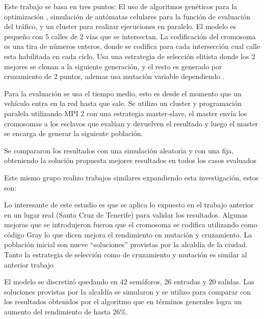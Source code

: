 \begin{itemize}
	\begin{item}
		
		Este trabajo se basa en tres puntos: El uso de algoritmos genéticos para la optimización , simulación de autómatas celulares para la función de evaluación del tráfico, y un cluster para realizar ejecuciones en paralelo.
		El modelo es pequeño con 5 calles de 2 vías que se intersectan.
		La codificación del cromosoma es una tira de números enteros, donde se codifica para cada intersección cual calle esta habilitada en cada ciclo.
		Usa una estrategia de selección elitista donde los 2 mejores se clonan a la siguiente generación, y el resto es generado por cruzamiento de 2 puntos, ademas usa mutación variable dependiendo .
		
		Para la evaluación se usa el tiempo medio, esto es desde el momento que un vehículo entra en la red hasta que sale. Se utilizo un cluster y programación paralela utilizando MPI 2 con una estrategia master-slave, el master envía los cromosomas a los esclavos que evalúan y devuelven el resultado y luego el master se encarga de generar la siguiente población.
		
		Se compararon los resultados con una simulación aleatoria y con una fija, obteniendo la solución propuesta mejores resultados en todos los casos evaluados
		
		Este mismo grupo realizo trabajos similares expandiendo esta investigación, estos son:
	\end{item}

	\begin{item}
		\bibentry{Sanchez2008}
Lo interesante de este estudio es que se aplica lo expuesto en el trabajo anterior en un lugar real (Santa Cruz de Tenerife) para validar los resultados.
Algunas mejoras que se introdujeron fueron que el cromosoma se codifica utilizando como código Gray lo que dicen mejora el rendimiento en mutación y cruzamiento. La población inicial son nueve “soluciones” provistas por la alcaldía de la ciudad. Tanto la estrategia de selección como de cruzamiento y mutación  es similar al anterior trabajo

El modelo se discretizó quedando en 42 semáforos, 26 entradas y 20 salidas.
Las soluciones provistas por la alcaldía se simularon y se utilizo para comparar con los resultados obtenidos por el algoritmo que en términos generales logra un aumento del rendimiento de hasta 26\%.

	\end{item}


\end{itemize}
